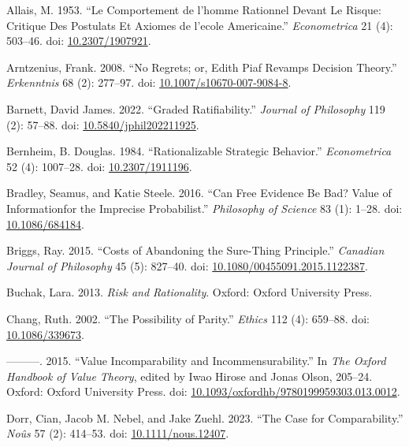 \documentclass[
  11pt,
  letterpaper,
  DIV=11,
  numbers=noendperiod,
  twoside]{scrartcl}
\newlength{\cslhangindent}
\newenvironment{CSLReferences}[2] %
 {\begin{list}{}{%
  \setlength{\itemindent}{0pt}
  \setlength{\leftmargin}{0pt}
  \setlength{\parsep}{0pt}
  \ifodd #1
   \setlength{\leftmargin}{\cslhangindent}
   \setlength{\itemindent}{-1\cslhangindent}
  \fi
  \setlength{\itemsep}{#2\baselineskip}}}
 {\end{list}}
\begin{document}
\label{refs}
\begin{CSLReferences}{1}{0}
Allais, M. 1953. {``Le Comportement de l'homme Rationnel Devant Le
Risque: Critique Des Postulats Et Axiomes de l'ecole Americaine.''}
\emph{Econometrica} 21 (4): 503--46. doi:
\href{https://doi.org/10.2307/1907921}{10.2307/1907921}.

Arntzenius, Frank. 2008. {``No Regrets; or, Edith Piaf Revamps Decision
Theory.''} \emph{Erkenntnis} 68 (2): 277--97. doi:
\href{https://doi.org/10.1007/s10670-007-9084-8}{10.1007/s10670-007-9084-8}.

Barnett, David James. 2022. {``Graded Ratifiability.''} \emph{Journal of
Philosophy} 119 (2): 57--88. doi:
\href{https://doi.org/10.5840/jphil202211925}{10.5840/jphil202211925}.

Bernheim, B. Douglas. 1984. {``Rationalizable Strategic Behavior.''}
\emph{Econometrica} 52 (4): 1007--28. doi:
\href{https://doi.org/10.2307/1911196}{10.2307/1911196}.

Bradley, Seamus, and Katie Steele. 2016. {``Can Free Evidence Be Bad?
Value of Informationfor the Imprecise Probabilist.''} \emph{Philosophy
of Science} 83 (1): 1--28. doi:
\href{https://doi.org/10.1086/684184}{10.1086/684184}.

Briggs, Ray. 2015. {``Costs of Abandoning the Sure-Thing Principle.''}
\emph{Canadian Journal of Philosophy} 45 (5): 827--40. doi:
\href{https://doi.org/10.1080/00455091.2015.1122387}{10.1080/00455091.2015.1122387}.

Buchak, Lara. 2013. \emph{Risk and Rationality}. Oxford: Oxford
University Press.

Chang, Ruth. 2002. {``The Possibility of Parity.''} \emph{Ethics} 112
(4): 659--88. doi:
\href{https://doi.org/10.1086/339673}{10.1086/339673}.

---------. 2015. {``Value Incomparability and Incommensurability.''} In
\emph{The Oxford Handbook of Value Theory}, edited by Iwao Hirose and
Jonas Olson, 205--24. Oxford: Oxford University Press. doi:
\href{https://doi.org/10.1093/oxfordhb/9780199959303.013.0012}{10.1093/oxfordhb/9780199959303.013.0012}.

Dorr, Cian, Jacob M. Nebel, and Jake Zuehl. 2023. {``The Case for
Comparability.''} \emph{Noûs} 57 (2): 414--53. doi:
\href{https://doi.org/10.1111/nous.12407}{10.1111/nous.12407}.


\end{CSLReferences}
\end{document}
